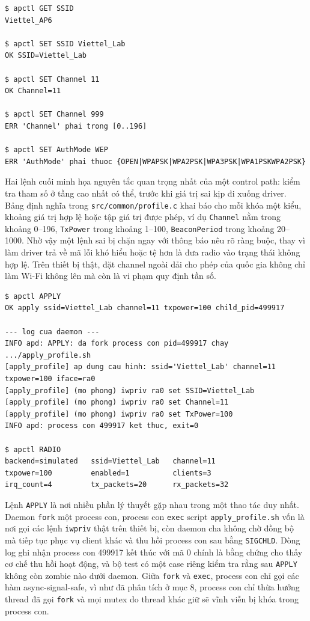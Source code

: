 \documentclass[11pt]{article}
\newcommand{\code}[1]{\texttt{#1}}
\begin{document}
\begin{lstlisting}[caption={Kiểm tra tính hợp lệ của tham số trước khi áp dụng}]
$ apctl GET SSID
Viettel_AP6

$ apctl SET SSID Viettel_Lab
OK SSID=Viettel_Lab

$ apctl SET Channel 11
OK Channel=11

$ apctl SET Channel 999
ERR 'Channel' phai trong [0..196]

$ apctl SET AuthMode WEP
ERR 'AuthMode' phai thuoc {OPEN|WPAPSK|WPA2PSK|WPA3PSK|WPA1PSKWPA2PSK}
\end{lstlisting}

Hai lệnh cuối minh họa nguyên tắc quan trọng nhất của một control path: kiểm tra tham số ở tầng cao nhất có thể, trước khi giá trị sai kịp đi xuống driver. Bảng định nghĩa trong \code{src/common/profile.c} khai báo cho mỗi khóa một kiểu, khoảng giá trị hợp lệ hoặc tập giá trị được phép, ví dụ \code{Channel} nằm trong khoảng 0--196, \code{TxPower} trong khoảng 1--100, \code{BeaconPeriod} trong khoảng 20--1000. Nhờ vậy một lệnh sai bị chặn ngay với thông báo nêu rõ ràng buộc, thay vì làm driver trả về mã lỗi khó hiểu hoặc tệ hơn là đưa radio vào trạng thái không hợp lệ. Trên thiết bị thật, đặt channel ngoài dải cho phép của quốc gia không chỉ làm Wi-Fi không lên mà còn là vi phạm quy định tần số.

\begin{lstlisting}[caption={APPLY: fork + exec script áp cấu hình, rồi đọc lại trạng thái radio}]
$ apctl APPLY
OK apply ssid=Viettel_Lab channel=11 txpower=100 child_pid=499917

--- log cua daemon ---
INFO apd: APPLY: da fork process con pid=499917 chay .../apply_profile.sh
[apply_profile] ap dung cau hinh: ssid='Viettel_Lab' channel=11 txpower=100 iface=ra0
[apply_profile] (mo phong) iwpriv ra0 set SSID=Viettel_Lab
[apply_profile] (mo phong) iwpriv ra0 set Channel=11
[apply_profile] (mo phong) iwpriv ra0 set TxPower=100
INFO apd: process con 499917 ket thuc, exit=0

$ apctl RADIO
backend=simulated   ssid=Viettel_Lab   channel=11
txpower=100         enabled=1          clients=3
irq_count=4         tx_packets=20      rx_packets=32
\end{lstlisting}

Lệnh \code{APPLY} là nơi nhiều phần lý thuyết gặp nhau trong một thao tác duy nhất. Daemon \code{fork} một process con, process con \code{exec} script \code{apply\_profile.sh} vốn là nơi gọi các lệnh \code{iwpriv} thật trên thiết bị, còn daemon cha không chờ đồng bộ mà tiếp tục phục vụ client khác và thu hồi process con sau bằng \code{SIGCHLD}. Dòng log ghi nhận process con 499917 kết thúc với mã 0 chính là bằng chứng cho thấy cơ chế thu hồi hoạt động, và bộ test có một case riêng kiểm tra rằng sau \code{APPLY} không còn zombie nào dưới daemon. Giữa \code{fork} và \code{exec}, process con chỉ gọi các hàm async-signal-safe, vì như đã phân tích ở mục 8, process con chỉ thừa hưởng thread đã gọi \code{fork} và mọi mutex do thread khác giữ sẽ vĩnh viễn bị khóa trong process con.
\end{document}
